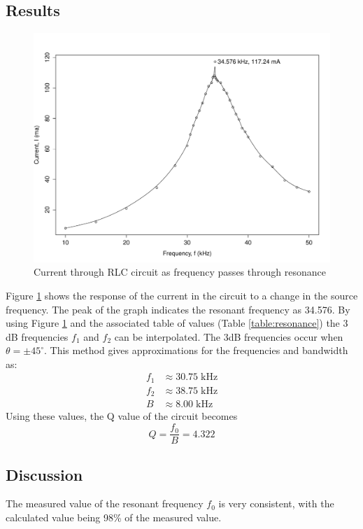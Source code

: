 \documentclass[12pt]{article}
\providecommand{\units}[1]{\;\text{#1}}
\begin{document}
\subsection{Results}\label{sec:res_results}
\begin{figure}[h]
	\centering
	\includegraphics[scale=0.5]{resonance_plot}
	\caption{Current through RLC circuit as frequency passes through resonance}
	\label{fig:res_graph}
\end{figure}
Figure \ref{fig:res_graph} shows the response of the current in the circuit to a change in the source frequency. The peak of the graph indicates the resonant frequency as 34.576\units{kHz}. By using Figure \ref{fig:res_graph} and the associated table of values (Table \ref{table:resonance}) the 3 dB frequencies $f_1$ and $f_2$ can be interpolated. The 3dB frequencies occur when $\theta = \pm 45^{\circ}$. This method gives approximations for the frequencies and bandwidth as:
\begin{align*}
	f_1 &\approx 30.75\units{kHz} \\
	f_2 &\approx 38.75\units{kHz} \\
	B &\approx 8.00\units{kHz}
\end{align*}
Using these values, the Q value of the circuit becomes
\begin{equation*}
Q=\frac{f_{0}}{B}=4.322
\end{equation*} 

\subsection{Discussion}\label{sec:res_discussion}
The measured value of the resonant frequency $f_0$ is very consistent, with the calculated value being 98\% of the measured value. 
\end{document}
